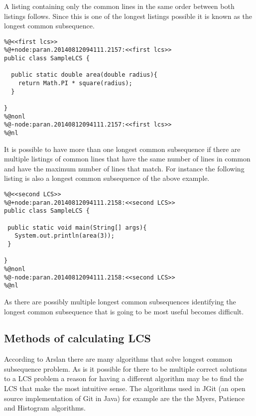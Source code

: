 A listing containing only the common lines in the same order between both listings follows.  Since this is one of the longest listings possible it is known as the longest common subsequence.  

\begin{lstlisting}
%@<<first lcs>>
%@+node:paran.20140812094111.2157:<<first lcs>>
public class SampleLCS { 

  public static double area(double radius){
    return Math.PI * square(radius);
  }
  
}
%@nonl
%@-node:paran.20140812094111.2157:<<first lcs>>
%@nl
\end{lstlisting}

It is possible to have more than one longest common subsequence if there are multiple listings of common lines that have the same number of lines in common and have the maximum number of lines that match.  For instance the following listing is also a longest common subsequence of the above example.

\begin{lstlisting}
%@<<second LCS>>
%@+node:paran.20140812094111.2158:<<second LCS>>
public class SampleLCS {

 public static void main(String[] args){
   System.out.println(area(3));
 }
 
}
%@nonl
%@-node:paran.20140812094111.2158:<<second LCS>>
%@nl
\end{lstlisting}

As there are possibly multiple longest common subsequences identifying the longest common subsequence that is going to be most useful becomes difficult.

\subsection{Methods of calculating LCS}
According to Arslan \cite{Arslan2010} there are many algorithms that solve longest common subsequence problem. As is it possible for there to be multiple correct solutions to a LCS problem a reason for having a different algorithm may be to find the LCS that make the most intuitive sense. The algorithms used in JGit (an open source implementation of Git in Java) for example are the the Myers, Patience and Histogram algorithms.

